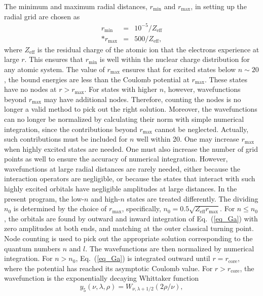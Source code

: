 The minimum and maximum radial distances, $r_\mathrm{min}$ and $r_\mathrm{max}$,
in setting up the radial grid are chosen as 
\begin{eqnarray}
r_\mathrm{min} &=& 10^{-5}/Z_\mathrm{eff} \nonumber \\*
r_\mathrm{max} &=& 500/Z_\mathrm{eff},
\end{eqnarray}
where $Z_\mathrm{eff}$ is the residual charge of the atomic ion that the
electrons experience at large $r$. This ensures that $r_\mathrm{min}$ is well
within the nuclear charge distribution for any atomic system. The value of
$r_\mathrm{max}$ ensures that for excited states below $n \sim 20$, the bound
energies are less than the Coulomb potential at $r_\mathrm{max}$. These states
have no nodes at $r > r_\mathrm{max}$. For states with higher $n$, however,
wavefunctions beyond $r_\mathrm{max}$ may have additional nodes. Therefore,
counting the nodes is no longer a valid method to pick out the right solution.
Moreover, the wavefunctions can no longer be normalized by calculating their
norm with simple numerical integration, since the contributions beyond
$r_\mathrm{max}$ cannot be neglected. Actually, such contributions must be
included for $n$ well within 20. One may increase $r_\mathrm{max}$ when highly
excited states are needed. One must also increase the number of grid points as
well to ensure the accuracy of numerical integration. However, wavefunctions at
large radial distances are rarely needed, either because the interaction
operators are negligible, or because the states that interact with such highly
excited orbitals have negligible amplitudes at large distances.  In the present
program, the low-$n$ and high-$n$ states are treated differently. The dividing
$n_0$ is determined by the choice of $r_\mathrm{max}$, specifically, $n_0 =
0.5\sqrt{Z_\mathrm{eff}r_\mathrm{max}}$. For $n \le n_0$, the orbitals are found
by outward and inward integration of Eq.~(\ref{eq_Ga}) with zero amplitudes at
both ends, and matching at the outer classical turning point. Node counting is
used to pick out the appropriate solution corresponding to the quantum numbers
$n$ and $l$. The wavefunctions are then normalized by  numerical integration.
For $n > n_0$, Eq.~(\ref{eq_Ga}) is integrated outward until
$r=r_\mathrm{core}$, where the potential has reached its asymptotic Coulomb
value. For $r > r_\mathrm{core}$, the wavefunction is the exponentially decaying
Whittaker function 
\begin{equation}
y_5(\nu, \lambda, \rho) = W_{\nu, \lambda+1/2}(2\rho/\nu),
\end{equation}
